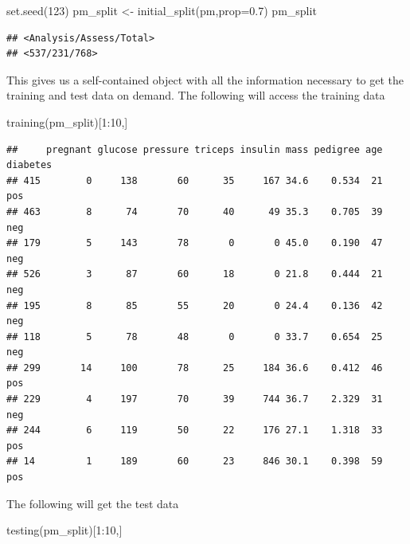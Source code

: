\documentclass[
]{article}
\newenvironment{Shaded}{\begin{snugshade}}{\end{snugshade}}
\newcommand{\AttributeTok}[1]{\textcolor[rgb]{0.77,0.63,0.00}{#1}}
\newcommand{\DecValTok}[1]{\textcolor[rgb]{0.00,0.00,0.81}{#1}}
\newcommand{\FloatTok}[1]{\textcolor[rgb]{0.00,0.00,0.81}{#1}}
\newcommand{\FunctionTok}[1]{\textcolor[rgb]{0.00,0.00,0.00}{#1}}
\newcommand{\NormalTok}[1]{#1}
\newcommand{\OtherTok}[1]{\textcolor[rgb]{0.56,0.35,0.01}{#1}}
\newcommand{\SpecialCharTok}[1]{\textcolor[rgb]{0.00,0.00,0.00}{#1}}
\begin{document}
\begin{Shaded}
\begin{Highlighting}[]
\FunctionTok{set.seed}\NormalTok{(}\DecValTok{123}\NormalTok{)}
\NormalTok{pm\_split }\OtherTok{\textless{}{-}} \FunctionTok{initial\_split}\NormalTok{(pm,}\AttributeTok{prop=}\FloatTok{0.7}\NormalTok{)}
\NormalTok{pm\_split}
\end{Highlighting}
\end{Shaded}

\begin{verbatim}
## <Analysis/Assess/Total>
## <537/231/768>
\end{verbatim}

This gives us a self-contained object with all the information necessary
to get the training and test data on demand. The following will access
the training data

\begin{Shaded}
\begin{Highlighting}[]
\FunctionTok{training}\NormalTok{(pm\_split)[}\DecValTok{1}\SpecialCharTok{:}\DecValTok{10}\NormalTok{,]}
\end{Highlighting}
\end{Shaded}

\begin{verbatim}
##     pregnant glucose pressure triceps insulin mass pedigree age diabetes
## 415        0     138       60      35     167 34.6    0.534  21      pos
## 463        8      74       70      40      49 35.3    0.705  39      neg
## 179        5     143       78       0       0 45.0    0.190  47      neg
## 526        3      87       60      18       0 21.8    0.444  21      neg
## 195        8      85       55      20       0 24.4    0.136  42      neg
## 118        5      78       48       0       0 33.7    0.654  25      neg
## 299       14     100       78      25     184 36.6    0.412  46      pos
## 229        4     197       70      39     744 36.7    2.329  31      neg
## 244        6     119       50      22     176 27.1    1.318  33      pos
## 14         1     189       60      23     846 30.1    0.398  59      pos
\end{verbatim}

The following will get the test data

\begin{Shaded}
\begin{Highlighting}[]
\FunctionTok{testing}\NormalTok{(pm\_split)[}\DecValTok{1}\SpecialCharTok{:}\DecValTok{10}\NormalTok{,]}
\end{Highlighting}
\end{Shaded}
\end{document}
